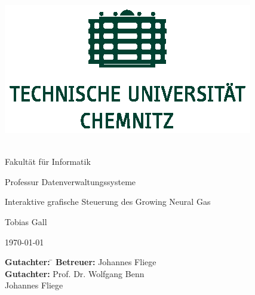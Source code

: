 \begingroup
\begin{center}

  \vspace*{-2.0cm}
  \includegraphics[scale=1.4]{figures/TU_Chemnitz_positiv_gruen} \\
  \hrulefill \\[1em]
  \medskip
  \par{\huge\sffamily Fakultät für Informatik}
  \medskip
  \par{\Large\sffamily Professur Datenverwaltungssysteme}

  \vspace*{1.5cm}

  \vfill

  \vspace*{.75cm}
  \par{}
  \vspace*{1.5cm}
  \par{\LARGE\sffamily
    Interaktive grafische Steuerung des Growing Neural Gas\par\null}
  \vspace*{0.75cm}

  \vfill
  \vfill

  \par{\large\sffamily Tobias Gall}
  \bigskip
  \par{\large\sffamily \today}

  \vfill

  \vspace*{1.5cm}
  \begin{minipage}{0.9\textwidth}
  \large\sffamily
  \begin{tabbing}
  {\bfseries Gutachter:}	\quad\=\kill
  {\bfseries Betreuer:}		\>Johannes Fliege \\
  {\bfseries Gutachter:}	\>Prof. Dr. Wolfgang Benn \\
  				\>Johannes Fliege \\
  \end{tabbing}
  \end{minipage}
\end{center}
\endgroup

